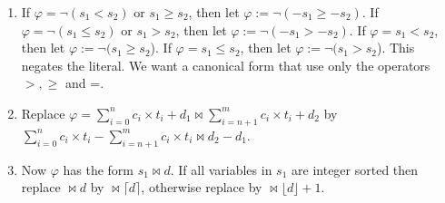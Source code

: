 \begin{enumerate}
    \item If $\varphi =  \neg (s_1 < s_2)$  or $s_1 \geq s_2$, then let $\varphi := \neg(- s_1 \geq - s_2)$.
    If $\varphi =  \neg (s_1 \leq s_2)$ or $s_1 > s_2$, then let $\varphi := \neg(- s_1 > - s_2)$.
    If $\varphi = s_1 < s_2$, then let $\varphi := \neg(s_1 \geq s_2$).
    If $\varphi = s_1 \leq s_2$, then let $\varphi := \neg(s_1 > s_2$).
    This negates the literal. We want a canonical form that use only the operators $>, \geq$ and =.

    

    \item Replace $\varphi = \sum_{i=0}^{n}c_i\times{}t_i + d_1 \bowtie \sum_{i=n+1}^{m} c_i\times{}t_i + d_2$  by $\sum_{i=0}^{n}c_i\times{}t_i - \sum_{i=n+1}^{m} c_i\times{}t_i
    \bowtie d_2 - d_1$.
    
    \item \label{la_generic:str}Now $\varphi$ has the form $s_1 \bowtie d$. If all
    variables in $s_1$ are integer sorted then replace $\bowtie d$ by $\bowtie \lceil d \rceil$,
    otherwise replace by $\bowtie \lfloor d\rfloor + 1$.



\end{enumerate}
